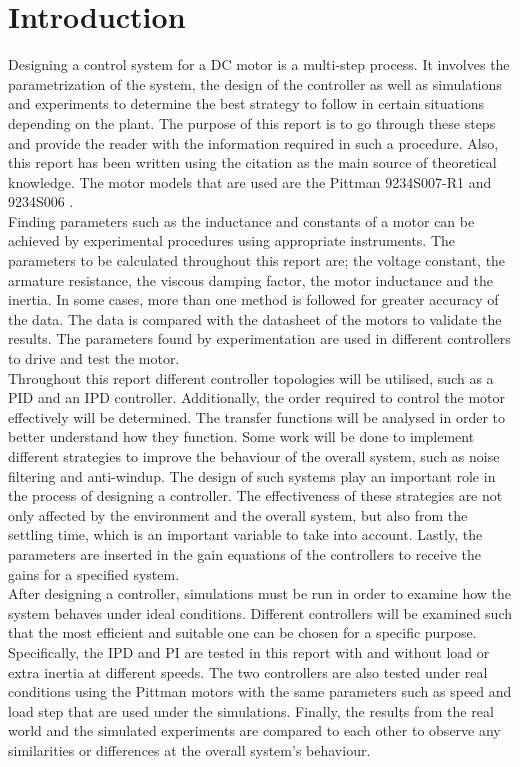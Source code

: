 \section{Introduction}
Designing a control system for a DC motor is a multi-step process. 
It involves the parametrization of the system, the design of the controller as well as simulations and experiments to determine the best strategy to follow in certain situations depending on the plant. 
The purpose of this report is to go through these steps and provide the reader with the information required in such a procedure. 
Also, this report has been written using the citation \cite{feedback} as the main source of theoretical knowledge. 
The motor models that are used are the Pittman 9234S007-R1 and 9234S006 \cite{pittmann}.
\\

Finding parameters such as the inductance and constants of a motor can be achieved by experimental procedures using appropriate instruments. 
The parameters to be calculated throughout this report are; the voltage constant, the armature resistance, the viscous damping factor, the motor inductance and the inertia. 
In some cases, more than one method is followed for greater accuracy of the data. 
The data is compared with the datasheet of the motors to validate the results. 
The parameters found by experimentation are used in different controllers to drive and test the motor. 
\\

Throughout this report different controller topologies will be utilised, such as a PID and an IPD controller. 
Additionally, the order required to control the motor effectively will be determined. 
The transfer functions will be analysed in order to better understand how they function.
Some work will be done to implement different strategies to improve the behaviour of the overall system, such as noise filtering and anti-windup. 
The design of such systems play an important role in the process of designing a controller. 
The effectiveness of these strategies are not only affected by the environment and the overall system, but also from the settling time, which is an important variable to take into account. 
Lastly, the parameters are inserted in the gain equations of the controllers to receive the gains for a specified system.
\\

After designing a controller, simulations must be run in order to examine how the system behaves under ideal conditions. 
Different controllers will be examined such that the most efficient and suitable one can be chosen for a specific purpose. 
Specifically, the IPD and PI are tested in this report with and without load or extra inertia at different speeds. 
The two controllers are also tested under real conditions using the Pittman motors with the same parameters such as speed and load step that are used under the simulations. 
Finally, the results from the real world and the simulated experiments are compared to each other to observe any similarities or differences at the overall system's behaviour.
